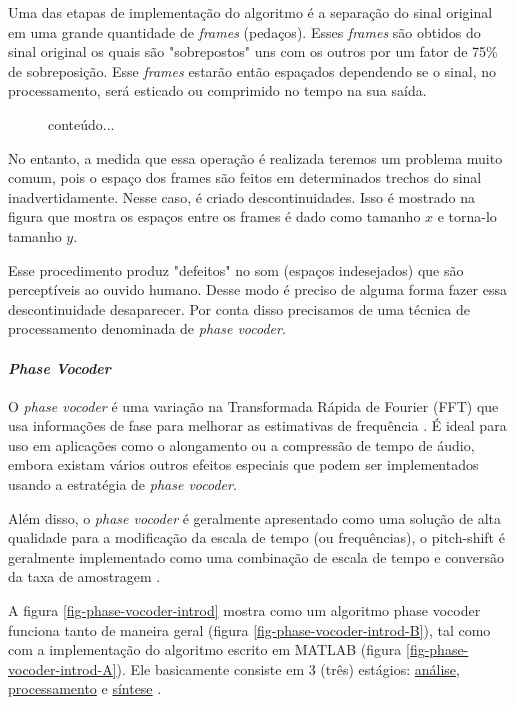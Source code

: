 				Uma das etapas de implementação do algoritmo é a separação do sinal original em uma grande quantidade de \textit{frames} (pedaços). Esses \textit{frames} são obtidos do sinal original os quais são "sobrepostos" uns com os outros por um fator de 75\% de sobreposição. Esse \textit{frames} estarão então espaçados dependendo se o sinal, no processamento, será esticado ou comprimido no tempo na sua saída.
				
				\begin{figure}
					conteúdo...
				\end{figure}
				
				No entanto, a medida que essa operação é realizada teremos um problema muito comum, pois o espaço dos frames são feitos em determinados trechos do sinal inadvertidamente. Nesse caso, é criado descontinuidades. Isso é mostrado na figura que mostra os espaços entre os frames é dado como tamanho $ x $ e torna-lo tamanho $ y $.
				
				\begin{figure}
					
				\end{figure}  
				
				Esse procedimento produz "defeitos" no som (espaços indesejados) que são perceptíveis ao ouvido humano. Desse modo é preciso de alguma forma fazer essa descontinuidade desaparecer. Por conta disso precisamos de uma técnica de processamento denominada de \textit{phase vocoder}.
				
			\paragraph{\textit{Phase Vocoder}}
				
				O \textit{phase vocoder} é uma variação na Transformada Rápida de Fourier (FFT) que usa informações de fase para melhorar as estimativas de frequência \cite{Sethares}. É ideal para uso em aplicações como o alongamento  ou a compressão de tempo de áudio, embora existam vários outros efeitos especiais que podem ser implementados usando a estratégia de \textit{phase vocoder}.
				
				Além disso, o \textit{phase vocoder} é geralmente apresentado como uma solução de alta qualidade para a modificação da escala de tempo (ou frequências), o pitch-shift é geralmente implementado como uma combinação de escala de tempo e conversão da taxa de amostragem \cite{Laroche1999}.
				
				A figura \ref{fig-phase-vocoder-introd} mostra como um algoritmo phase vocoder funciona tanto de maneira geral (figura \ref{fig-phase-vocoder-introd-B}), tal como com a implementação do algoritmo escrito em MATLAB (figura \ref{fig-phase-vocoder-introd-A}). Ele basicamente consiste em 3 (três) estágios: \underline{análise}, \underline{processamento} e \underline{síntese} \cite{Portnoff1976}. 
				
